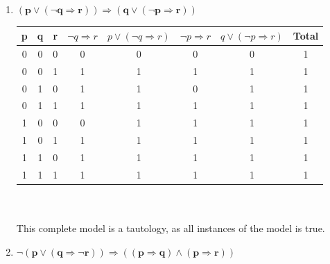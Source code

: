 \begin{large}
\begin{enumerate}[label= (\alph*)]
    \item $\mathbf{ (p \lor(\neg q \Rightarrow r)) \Rightarrow (q \lor (\neg p \Rightarrow r))} $

          \begin{tabular}{c|c|c|c|c|c|c||c}
            p & q & r & $ \neg q \Rightarrow r $ & $ p \lor (\neg q \Rightarrow r) $ & $ \neg p \Rightarrow r $ & $ q \lor (\neg p \Rightarrow r) $ & Total \\
            \hline\hline
            0 & 0 & 0 & 0                        & 0                                 & 0                        & 0                                 & 1     \\
            \hline
            0 & 0 & 1 & 1                        & 1                                 & 1                        & 1                                 & 1     \\
            \hline
            0 & 1 & 0 & 1                        & 1                                 & 0                        & 1                                 & 1     \\
            \hline
            0 & 1 & 1 & 1                        & 1                                 & 1                        & 1                                 & 1     \\
            \hline
            1 & 0 & 0 & 0                        & 1                                 & 1                        & 1                                 & 1     \\
            \hline
            1 & 0 & 1 & 1                        & 1                                 & 1                        & 1                                 & 1     \\
            \hline
            1 & 1 & 0 & 1                        & 1                                 & 1                        & 1                                 & 1     \\
            \hline
            1 & 1 & 1 & 1                        & 1                                 & 1                        & 1                                 & 1     \\
            \hline
          \end{tabular}
          \\ \\
          This complete model is a tautology, as all instances of the model is true.

    \item $\mathbf{ \neg(p \lor( q \Rightarrow \neg r)) \Rightarrow (( p \Rightarrow  q) \land ( p \Rightarrow  r)) }$


\end{enumerate}
\end{large}
